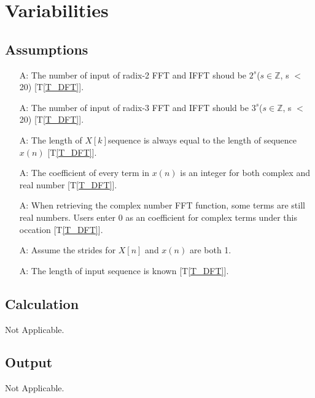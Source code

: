 \documentclass[12pt]{article}
\newcommand{\tref}[1]{T\ref{#1}}
\newcounter{assumpnum} %
\begin{document}
\section{Variabilities}

\subsection{Assumptions}

\begin{itemize}

\item[A\refstepcounter{assumpnum}\theassumpnum \label{A_meaningfulLabel}:]
The number of  input of radix-2 FFT and IFFT shoud be $2^s$($s\in\mathbb{Z}$, s $<$ 20) [\tref{T_DFT}].
\item[A\refstepcounter{assumpnum}\theassumpnum \label{A_meaningfulLabel}:]
The number of input of radix-3 FFT and IFFT should be $3^s$($s\in\mathbb{Z}$, s $<$ 20) [\tref{T_DFT}].
\item[A\refstepcounter{assumpnum}\theassumpnum \label{A_meaningfulLabel}:]
The length of $X[k] $sequence is always equal to the length of sequence $x(n)$  [\tref{T_DFT}].
\item[A\refstepcounter{assumpnum}\theassumpnum \label{A_meaningfulLabel}:]
The coefficient of every term in $x(n)$ is an integer for both complex and real number  [\tref{T_DFT}].
\item[A\refstepcounter{assumpnum}\theassumpnum \label{A_meaningfulLabel}:]
When retrieving the complex number FFT function, some terms are still real numbers. Users enter 0 as an coefficient for complex terms under this occation [\tref{T_DFT}].
\item[A\refstepcounter{assumpnum}\theassumpnum \label{A_meaningfulLabel}:]
Assume the strides for ${X}[n]$ and ${x}(n)$ are both 1.
\item[A\refstepcounter{assumpnum}\theassumpnum \label{A_meaningfulLabel}:]
The length of input sequence is known [\tref{T_DFT}].


\end{itemize}

\subsection{Calculation} \label{sec_Calculation}
Not Applicable.
\subsection{Output} \label{sec_Output}    
Not Applicable.
\end{document}

